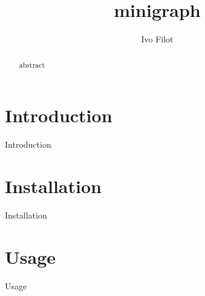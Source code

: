 \documentclass[10pt, a4paper]{article}
\begin{document}
\title{minigraph}
\author{Ivo Filot}

\maketitle

\begin{abstract}
abstract
\end{abstract}

\tableofcontents

\section{Introduction}
Introduction

\section{Installation}
Installation

\section{Usage}
Usage
\end{document}
